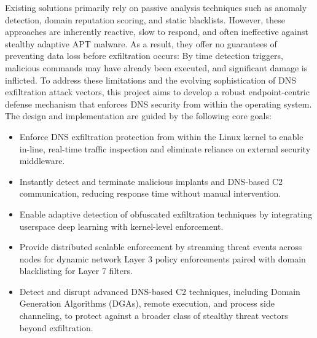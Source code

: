 \documentclass [11pt, proquest] {uwthesis}[2020/02/24]
\begin{document}
Existing solutions primarily rely on passive analysis techniques such as anomaly detection, domain reputation scoring, and static blacklists. However, these approaches are inherently reactive, slow to respond, and often ineffective against stealthy adaptive APT malware. As a result, they offer no guarantees of preventing data loss before exfiltration occurs: By time detection triggers, malicious commands may have already been executed, and significant damage is inflicted.
To address these limitations and the evolving sophistication of DNS exfiltration attack vectors, this project aims to develop a robust endpoint-centric defense mechanism that enforces DNS security from within the operating system. The design and implementation are guided by the following core goals:
\begin{itemize}[nosep]
  \item Enforce DNS exfiltration protection from within the Linux kernel to enable in-line, real-time traffic inspection and eliminate reliance on external security middleware.
  \item Instantly detect and terminate malicious implants and DNS-based C2 communication, reducing response time without manual intervention.
  \item Enable adaptive detection of obfuscated exfiltration techniques by integrating userspace deep learning with kernel-level enforcement.
  \item Provide distributed scalable enforcement by streaming threat events across nodes for dynamic network Layer 3 policy enforcements paired with domain blacklisting for Layer 7 filters.
  \item Detect and disrupt advanced DNS-based C2 techniques, including Domain Generation Algorithms (DGAs), remote execution, and process side channeling, to protect against a broader class of stealthy threat vectors beyond exfiltration.
\end{itemize}


\end{document}

